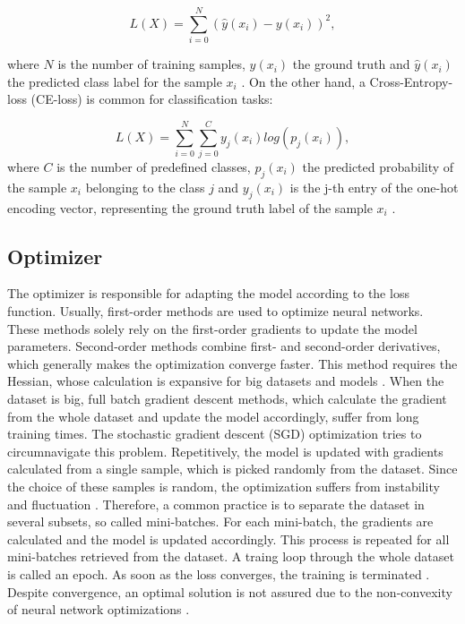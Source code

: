 \begin{equation}
L(X) =  \sum_{i=0}^{N}(\hat{y}(x_{i})-y(x_{i}))^2,
\end{equation}

where $N$ is the number of training samples, $y(x_{i})$ the ground truth and $\hat{y}(x_{i})$ the predicted class label for the sample $x_{i}$ \cite{Calin2020}. On the other hand, a Cross-Entropy-loss (CE-loss) is common for classification tasks: 

\begin{equation}
L(X) = \sum_{i=0}^{N} \sum_{j=0}^{C} y_{j}(x_{i}) log(p_{j}(x_{i})),
\end{equation}
where $C$ is the number of predefined classes, $p_{j}(x_{i})$ the predicted probability of the sample $x_{i}$ belonging to the class $j$ and $y_{j}(x_{i})$ is the j-th entry of the one-hot encoding vector, representing the ground truth label of the sample $x_{i}$ \cite{ShilohPerl2020}.



\subsection{Optimizer}
The optimizer is responsible for adapting the model according to the loss function. Usually, first-order methods are used to optimize neural networks. These methods solely rely on the first-order gradients to update the model parameters. Second-order methods combine first- and second-order derivatives, which generally makes the optimization converge faster. This method requires the Hessian, whose calculation is expansive for big datasets and models \cite{Calin2020}\cite{ShilohPerl2020}. When the dataset is big, full batch gradient descent methods, which calculate the gradient from the whole dataset and update the model accordingly, suffer from long training times. The stochastic gradient descent (SGD) optimization tries to circumnavigate this problem. Repetitively, the model is updated with gradients calculated from a single sample, which is picked randomly from the dataset. Since the choice of these samples is random, the optimization suffers from instability and fluctuation \cite{ShilohPerl2020}. Therefore, a common practice is to separate the dataset in several subsets, so called mini-batches. For each mini-batch, the gradients are calculated and the model is updated accordingly. This process is repeated for all mini-batches retrieved from the dataset. A traing loop through the whole dataset is called an epoch. As soon as the loss converges, the training is terminated \cite{ShilohPerl2020}. Despite convergence, an optimal solution is not assured due to the non-convexity of neural network optimizations \cite{ShilohPerl2020}.

